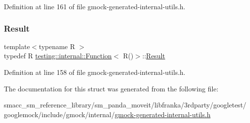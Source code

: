 Definition at line 161 of file gmock-\/generated-\/internal-\/utils.\+h.

\mbox{\label{structtesting_1_1internal_1_1Function_3_01R_07_08_4_a5c228a886ef598ac10988f8de5e32ca1}} 
\subsubsection{\texorpdfstring{Result}{Result}}
{\footnotesize\ttfamily template$<$typename R $>$ \\
typedef R \hyperlink{structtesting_1_1internal_1_1Function}{testing\+::internal\+::\+Function}$<$ R()$>$\+::\hyperlink{structtesting_1_1internal_1_1Function_3_01R_07_08_4_a5c228a886ef598ac10988f8de5e32ca1}{Result}}



Definition at line 158 of file gmock-\/generated-\/internal-\/utils.\+h.



The documentation for this struct was generated from the following file\+:\begin{DoxyCompactItemize}
\item 
smacc\+\_\+sm\+\_\+reference\+\_\+library/sm\+\_\+panda\+\_\+moveit/libfranka/3rdparty/googletest/googlemock/include/gmock/internal/\hyperlink{gmock-generated-internal-utils_8h}{gmock-\/generated-\/internal-\/utils.\+h}\end{DoxyCompactItemize}
